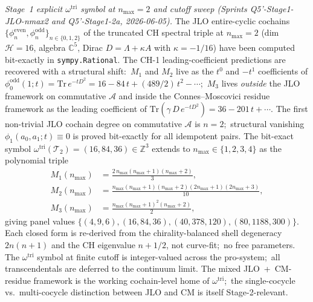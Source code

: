 \documentclass[11pt,a4paper]{article}
\theoremstyle{plain}
\theoremstyle{definition}
\newcommand{\C}{\mathbb{C}}
\newcommand{\Z}{\mathbb{Z}}
\begin{document}
\emph{Stage~1 explicit $\omega^{\mathrm{tri}}$ symbol at $n_{\max} = 2$
and cutoff sweep (Sprints Q5'-Stage1-JLO-nmax2 and Q5'-Stage1-2a,
2026-06-05).}  The JLO
entire-cyclic cochains $\{\phi_n^{\mathrm{even}},
\phi_n^{\mathrm{odd}}\}_{n \in \{0, 1, 2\}}$ of the truncated CH
spectral triple at $n_{\max} = 2$ (dim $\mathcal{H} = 16$, algebra
$\C^5$, Dirac $D = \Lambda + \kappa A$ with $\kappa = -1/16$) have
been computed bit-exactly in \texttt{sympy.Rational}.  The CH-1
leading-coefficient predictions are recovered with a structural
shift:\ $M_1$ and $M_2$ live as the $t^0$ and $-t^1$ coefficients of
$\phi_0^{\mathrm{odd}}(1; t) = \mathrm{Tr}\,e^{-tD^2} = 16 - 84\,t +
(489/2)\,t^2 - \cdots$;\ $M_3$ lives \emph{outside} the JLO
framework on commutative $\mathcal{A}$ and inside the
Connes--Moscovici residue framework as the leading coefficient of
$\mathrm{Tr}(\gamma\,D\,e^{-tD^2}) = 36 - 201\,t + \cdots$.  The
first non-trivial JLO cochain degree on commutative $\mathcal{A}$
is $n = 2$;\ structural vanishing $\phi_1(a_0, a_1; t) \equiv 0$ is
proved bit-exactly for all idempotent pairs.  The bit-exact symbol
$\omega^{\mathrm{tri}}(\mathcal{T}_2) = (16, 84, 36) \in \Z^3$
extends to $n_{\max} \in \{1, 2, 3, 4\}$ as the polynomial triple
\begin{align*}
   M_1(n_{\max}) &= \tfrac{2\,n_{\max}(n_{\max}+1)(n_{\max}+2)}{3}, \\
   M_2(n_{\max}) &= \tfrac{n_{\max}(n_{\max}+1)(n_{\max}+2)(2n_{\max}+1)(2n_{\max}+3)}{10}, \\
   M_3(n_{\max}) &= \tfrac{n_{\max}(n_{\max}+1)^2(n_{\max}+2)}{2},
\end{align*}
giving panel values $\{(4, 9, 6), (16, 84, 36), (40, 378, 120),
(80, 1188, 300)\}$.  Each closed form is re-derived from the
chirality-balanced shell degeneracy $2n(n{+}1)$ and the CH
eigenvalue $n{+}1/2$, not curve-fit;\ no free parameters.  The
$\omega^{\mathrm{tri}}$ symbol at finite cutoff is integer-valued
across the pro-system;\ all transcendentals are deferred to the
continuum limit.  The mixed JLO~+~CM-residue framework is the
working cochain-level home of $\omega^{\mathrm{tri}}$;\ the
single-cocycle vs.\ multi-cocycle distinction between JLO and CM
is itself Stage-2-relevant.
\end{document}
